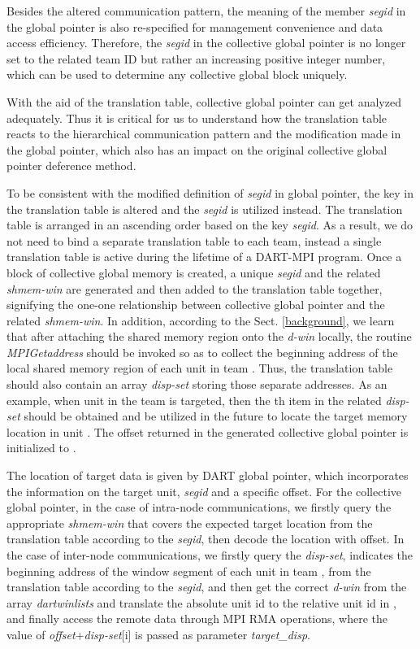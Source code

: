 \documentclass{llncs}
\begin{document}
{Besides the altered communication pattern, the meaning of the member \textit{segid} in the global pointer
is also \mbox{re-specified}
for management convenience and data access efficiency. Therefore, the \textit{segid} 
in the collective global pointer is no longer set to the related team ID but rather
an increasing positive integer number, which 
can be used to determine any collective global block uniquely. 

With the aid of the translation table\cite{dart-mpi}, 
collective global pointer can get analyzed adequately.
Thus it is critical for us to understand how the translation table 
reacts to the hierarchical communication pattern and 
the modification made in the global pointer, which also
has an impact on the original collective global pointer deference method.

To be consistent with the modified definition of \textit{segid} in global pointer,
the key in the translation table is altered and the \textit{segid} is utilized instead.
The translation table is arranged in an ascending order based on the key \textit{segid}. 
As a result,
we do not need to bind a separate translation table to each team, 
instead a single translation table is active during the lifetime of a \mbox{DART-MPI} program. 
Once a block of collective global memory is created, a unique \textit{segid} 
and the related \textit{shmem-win} are generated
and then added to the translation table
together, signifying the \mbox{one-one} relationship between collective global pointer and the related \textit{shmem-win}.
In addition, according to the Sect. \ref{background}, we learn that after 
attaching the shared memory region onto the \mbox{\textit{d-win}} locally, the routine  
{\em MPIGetaddress} should be invoked
so as to collect the beginning address of the local shared memory region
of each unit in team . Thus, the translation 
table should also contain an array \mbox{\textit{disp-set}}
storing those separate addresses. 
As an example, when unit  in the team  is targeted, then the th item in the related
\mbox{\textit{disp-set}} should be obtained and be utilized in the future to locate the target memory location in unit .
The offset returned in the generated 
collective global pointer is initialized to .


The location of target data is given by DART global pointer, which incorporates the information 
on the target unit, 
\textit{segid} and a specific offset. 
For the collective global pointer, in the case of intra-node communications, 
we firstly query the appropriate \mbox{\textit{shmem-win}} that covers the expected target 
location from the translation table according to the \textit{segid}, then decode the location with 
offset. In the case of inter-node communications,
we firstly query the \mbox{\textit{disp-set}}, indicates the beginning address of the window segment of each unit in team ,
from the translation table according to the \textit{segid}, and then get the correct \mbox{\textit{d-win}} from the array {\em dartwinlists}
and translate the absolute unit id to the relative unit id  in ,
and finally access the remote data through MPI RMA operations, where
the value of \textit{offset}+\textit{disp-set}[i]
is passed as parameter \textit{target\_disp}.

}
\end{document}
